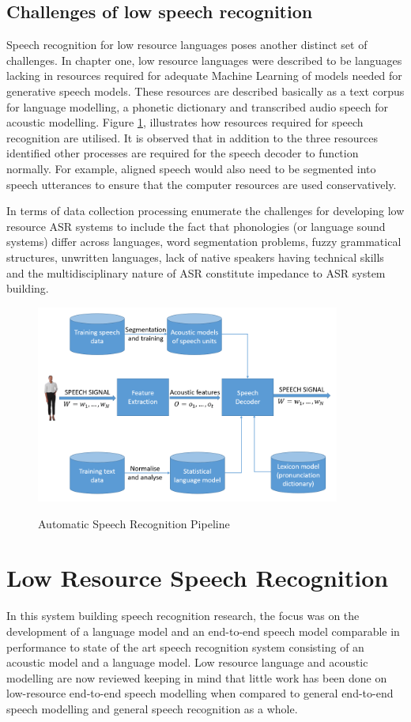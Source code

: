 \subsection{Challenges of low speech recognition}
Speech recognition for low resource languages poses another distinct set of challenges.  In chapter one, low resource languages were described to be languages lacking in resources required for adequate Machine Learning of models needed for generative speech models.  These resources are described basically as a text corpus for language modelling, a phonetic dictionary and transcribed audio speech for acoustic modelling. Figure \ref{fig_2_2_asr_pipeline}, illustrates how resources required for speech recognition are utilised.  It is observed that in addition to the three resources identified other processes are required for the speech decoder to function normally.  For example, aligned speech would also need to be segmented into speech utterances to ensure that the computer resources are used conservatively.

In terms of data collection processing \cite{besacier2014automatic} enumerate the  challenges for developing low resource ASR systems to include the fact that phonologies (or language sound systems) differ across languages, word segmentation problems, fuzzy grammatical structures, unwritten languages, lack of native speakers having technical skills and the multidisciplinary nature of ASR constitute impedance to ASR system building.

\begin{figure}
\centering
  \includegraphics[width=10cm]{thesis/images/asr_pipeline}\\
  \caption{Automatic Speech Recognition Pipeline} \cite{besacier2014automatic}\label{fig_2_2_asr_pipeline}
\end{figure}

\section{Low Resource Speech Recognition}
In this system building speech recognition research, the focus was on the development of a language model and an end-to-end speech model comparable in performance to state of the art speech recognition system consisting of an acoustic model and a language model.  Low resource language and acoustic modelling are now reviewed keeping in mind that little work has been done on low-resource end-to-end speech modelling when compared to general end-to-end speech modelling and general speech recognition as a whole.  

